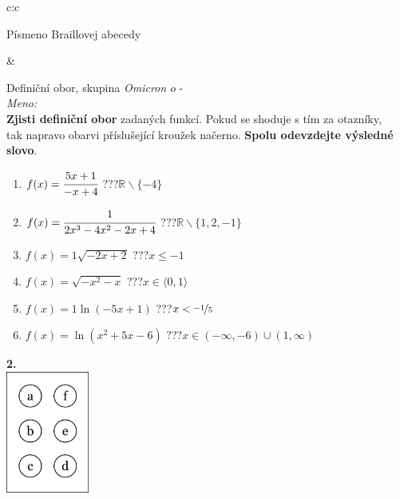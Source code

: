 \documentclass[10pt]{report}
\newcommand\omicron{o}
\begin{document}
\begin{tabular}{c:c}
\begin{minipage}[c][99mm][t]{0.49\linewidth}
\begin{center}
\begin{minipage}{0.20\linewidth}
\begin{center}
{\small Písmeno Braillovej abecedy}
\end{center}
\end{minipage}
\end{center}
\end{minipage}
&
\begin{minipage}[c][99mm][t]{0.49\linewidth}
\begin{center}
\vspace{7mm}
{\huge Definiční obor, skupina \textit{Omicron $\omicron$} -}\\[4.5mm]
\textit{Meno:}\phantom{xxxxxxxxxxxxxxxxxxxxxxxxxxxxxxxxxxxxxxxxxxxxxxxxxxxxxxxxxxxxxxxxx}\\[3.5mm]
\textbf{Zjisti definiční obor} zadaných funkcí. Pokud se shoduje s tím za otazníky,\\tak napravo obarvi příslušející kroužek načerno. \textbf{Spolu odevzdejte výsledné slovo}.\\[3mm]
\begin{minipage}{0.77\linewidth}
\begin{center}
\begin{varwidth}{\textwidth}
\begin{enumerate}
\normalsize
\item $f(x)=\cfrac{5x+1}{-x+4}$\quad \dotfill\; ???\;\dotfill \quad $\mathbb{R}\smallsetminus\{-4\}$
\item $f(x)=\cfrac{1}{2x^3-4x^2-2x+4}$\quad \dotfill\; ???\;\dotfill \quad $\mathbb{R}\smallsetminus\{1,2,-1\}$
\item $f(x)=1\sqrt{-2x+2}$\quad \dotfill\; ???\;\dotfill \quad $x\leq-1$
\item $f(x)=\sqrt{-x^2-x}$\quad \dotfill\; ???\;\dotfill \quad $x\in\langle0 , 1\rangle$
\item $f(x)=1\ln{(-5x+1)}$\quad \dotfill\; ???\;\dotfill \quad $x<\nicefrac{-1}{5}$
\item $f(x)=\ln{(x^2+5x-6)}$\quad \dotfill\; ???\;\dotfill \quad $x\in(-\infty , -6)\cup(1 , \infty)$
\end{enumerate}
\end{varwidth}
\end{center}
\end{minipage}
\begin{minipage}{0.20\linewidth}
\begin{center}
{\Huge\bfseries 2.} \\[2mm]
\includegraphics[height=40mm]{../images/braille.png}

\end{center}
\end{minipage}
\end{center}
\end{minipage}
\end{tabular}
\end{document}
